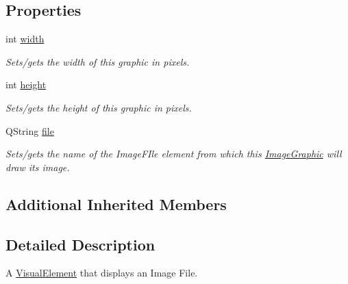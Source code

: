 \subsection*{Properties}
\begin{DoxyCompactItemize}
\item 
\hypertarget{class_picto_1_1_image_graphic_a16071c3822df7d74b91de461dc7a6d7f}{int \hyperlink{class_picto_1_1_image_graphic_a16071c3822df7d74b91de461dc7a6d7f}{width}}\label{class_picto_1_1_image_graphic_a16071c3822df7d74b91de461dc7a6d7f}

\begin{DoxyCompactList}\small\item\em Sets/gets the width of this graphic in pixels. \end{DoxyCompactList}\item 
\hypertarget{class_picto_1_1_image_graphic_a2ae0ece3ee8c2f8782bf7c303e547ea5}{int \hyperlink{class_picto_1_1_image_graphic_a2ae0ece3ee8c2f8782bf7c303e547ea5}{height}}\label{class_picto_1_1_image_graphic_a2ae0ece3ee8c2f8782bf7c303e547ea5}

\begin{DoxyCompactList}\small\item\em Sets/gets the height of this graphic in pixels. \end{DoxyCompactList}\item 
\hypertarget{class_picto_1_1_image_graphic_a322776f37f076047d7a1151cb314fc67}{Q\-String \hyperlink{class_picto_1_1_image_graphic_a322776f37f076047d7a1151cb314fc67}{file}}\label{class_picto_1_1_image_graphic_a322776f37f076047d7a1151cb314fc67}

\begin{DoxyCompactList}\small\item\em Sets/gets the name of the Image\-F\-Ile element from which this \hyperlink{class_picto_1_1_image_graphic}{Image\-Graphic} will draw its image. \end{DoxyCompactList}\end{DoxyCompactItemize}
\subsection*{Additional Inherited Members}


\subsection{Detailed Description}
A \hyperlink{struct_picto_1_1_visual_element}{Visual\-Element} that displays an Image File. 

